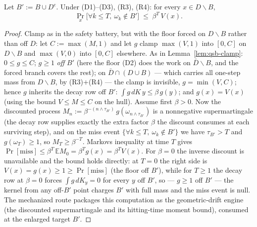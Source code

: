\begin{blemma}
\label{lem:qdb-tail}
Let $B' := B \cup D^{\mathrm{c}}$. Under (D1)--(D3), (R3), (R4): for
every $x \in D \smallsetminus B$,
\[
\Pr_x\bigl[\forall k \le T,\ \omega_k \notin B'\bigr]
\;\le\; \beta^{T}\, V(x).
\]
\end{blemma}
\begin{proof}
Clamp as in the safety battery, but with the floor forced on
$D \smallsetminus B$ rather than off $D$: let
$C := \max(M, 1)$ and let $g$ clamp $\max(V,1)$ into $[0,C]$ on
$D \smallsetminus B$ and $\max(V,0)$ into $[0,C]$ elsewhere. As in
Lemma~\ref{lem:qsb-clamp}: $0 \le g \le C$; $g \ge 1$ \emph{off} $B'$
(here the floor (D2) does the work on
$\bar{D} \smallsetminus B$, and the forced branch covers the rest); on
$\bar{D} \cap (D \cup B)$ --- which carries all one-step mass from
$D \smallsetminus B$, by (R3)$+$(R4) --- the clamp is invisible,
$g = \min(V, C)$; hence $g$ inherits the decay row off $B'$:
$\int g \,dK\,y \le \beta\, g(y)$; and $g(x) = V(x)$ (using the bound
$V \le M \le C$ on the hull). Assume first $\beta > 0$. Now the
discounted process
$M_n := \beta^{-(n \wedge \tau_{B'})}\, g(\omega_{n \wedge \tau_{B'}})$
is a nonnegative supermartingale (the decay row supplies exactly the
extra factor $\beta$ the discount consumes at each surviving step), and
on the miss event $\{\forall k \le T,\ \omega_k \notin B'\}$ we have
$\tau_{B'} > T$ and $g(\omega_T) \ge 1$, so $M_T \ge \beta^{-T}$.
Markov\textquotesingle s inequality at time $T$ gives
$\Pr[\text{miss}] \le \beta^{T}\, \mathbb{E} M_0
= \beta^{T} g(x) = \beta^{T} V(x)$. For $\beta = 0$ the inverse
discount is unavailable and the bound holds directly: at $T = 0$ the
right side is $V(x) = g(x) \ge 1 \ge \Pr[\text{miss}]$ (the floor off
$B'$), while for $T \ge 1$ the decay row at $\beta = 0$ forces
$\int g \,dK_y = 0$ for every $y$ off $B'$, so --- $g \ge 1$ off $B'$
--- the kernel from any off-$B'$ point charges $B'$ with full mass and
the miss event is null. The mechanized route packages this
computation as the geometric-drift engine (the discounted
supermartingale and its hitting-time moment bound), consumed at the
enlarged target $B'$.
\end{proof}

